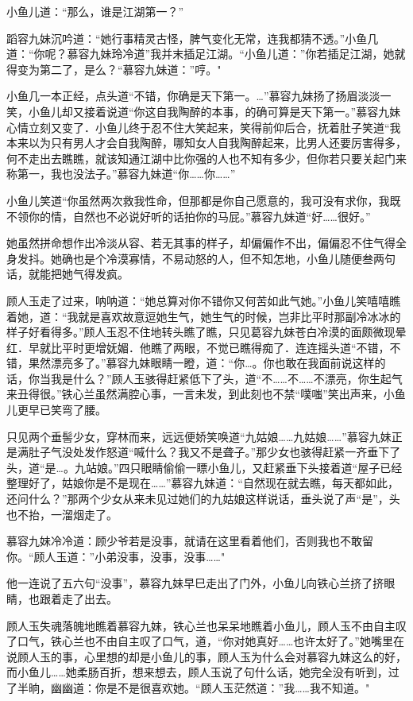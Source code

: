 \documentclass[12pt,oneside]{book}
\begin{document}
小鱼儿道：``那么，谁是江湖第一？''

蹈容九妹沉吟道：``她行事精灵古怪，脾气变化无常，连我都猜不透。''小鱼几道：``你呢？慕容九妹玲冷道''我并末插足江湖。``小鱼儿道：''你若插足江湖，她就得变为第二了，是么？``慕容九妹道：''哼。"

小鱼几一本正经，点头道``不错，你确是天下第一。\ldots{}''慕容九妹扬了扬眉淡淡一笑，小鱼儿却又接着说道``你这自我陶醉的本事，的确可算是天下第一。''慕容九妹心情立刻又变了．小鱼儿终于忍不住大笑起来，笑得前仰后合，抚着肚子笑道``我本来以为只有男人才会自我陶醉，哪知女人自我陶醉起来，比男人还要厉害得多，何不走出去瞧瞧，就该知通江湖中比你强的人也不知有多少，但你若只要关起门来称第一，我也没法子。''慕容九妹道``你\ldots\ldots 你\ldots\ldots{}''

小鱼儿笑道``你虽然两次救我性命，但那都是你自己愿意的，我可没有求你，我既不领你的情，自然也不必说好听的话拍你的马屁。''慕容九妹道``好\ldots\ldots 很好。''

她虽然拼命想作出冷淡从容、若无其事的样子，却偏偏作不出，偏偏忍不住气得全身发抖。她确也是个冷漠寡情，不易动怒的人，但不知怎地，小鱼儿随便叁两句话，就能把她气得发疯。

顾人玉走了过来，呐呐道：``她总算对你不错你又何苦如此气她。''小鱼儿笑嘻嘻瞧着她，道：``我就是喜欢故意逗她生气，她生气的时候，岂非比平时那副冷冰冰的样子好看得多。''顾人玉忍不住地转头瞧了瞧，只见葛容九妹苍白冷漠的面颇微现晕红．早就比平时更增妩媚．他瞧了两眼，不觉已瞧得痴了．连连摇头道``不错，不错，果然漂亮多了。''慕容九妹眼睛一瞪，道：``你\ldots。你也敢在我面前说这样的话，你当我是什么？''顾人玉骇得赶紧低下了头，道``不\ldots\ldots 不\ldots\ldots 不漂亮，你生起气来丑得很。''铁心兰虽然满腔心事，一言未发，到此刻也不禁``噗嗤''笑出声来，小鱼儿更早已笑弯了腰。

只见两个垂髻少女，穿林而来，远远便娇笑唤道``九姑娘\ldots\ldots 九姑娘\ldots\ldots{}''慕容九妹正是满肚子气没处发作怒道``喊什么？我又不是聋子。''那少女也骇得赶紧一齐垂下了头，道``是\ldots。九站娘。''四只眼睛偷偷一瞟小鱼儿，又赶紧垂下头接着道``屋子已经整理好了，姑娘你是不是现在\ldots\ldots{}''慕容九妹道：``自然现在就去瞧，每天都如此，还问什么？''那两个少女从来未见过她们的九姑娘这样说话，垂头说了声``是''，头也不抬，一溜烟走了。

慕容九妹冷冷道：顾少爷若是没事，就请在这里看着他们，否则我也不敢留你。``顾人玉道：''小弟没事，没事，没事\ldots\ldots"

他一连说了五六句``没事''，慕容九妹早巳走出了门外，小鱼儿向铁心兰挤了挤眼睛，也跟着走了出去。

顾人玉失魂落魄地瞧着慕容九妹，铁心兰也呆呆地瞧着小鱼儿，顾人玉不由自主叹了口气，铁心兰也不由自主叹了口气，道，``你对她真好\ldots\ldots 也许太好了。''她嘴里在说顾人玉的事，心里想的却是小鱼儿的事，顾人玉为什么会对慕容九妹这么的好，而小鱼儿\ldots\ldots 她柔肠百折，想来想去，顾人玉说了句什么话，她完全没有听到，过了半晌，幽幽道：你是不是很喜欢她。``顾人玉茫然道：''我\ldots\ldots 我不知道。"
\end{document}
